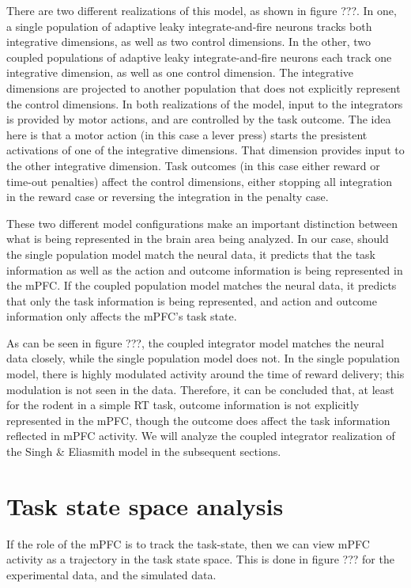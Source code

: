 \documentclass[12pt]{article}
\begin{document}
There are two different realizations
of this model, as shown in figure ???.
In one, a single population of adaptive
leaky integrate-and-fire neurons tracks both
integrative dimensions, as well as two control dimensions.
In the other, two coupled populations
of adaptive leaky integrate-and-fire neurons
each track one integrative dimension, as well
as one control dimension.
The integrative dimensions are projected
to another population that does not explicitly
represent the control dimensions.
In both realizations of the model,
input to the integrators is provided
by motor actions, and are controlled
by the task outcome.
The idea here is that a motor action
(in this case a lever press)
starts the presistent activations
of one of the integrative dimensions.
That dimension provides input to the other integrative dimension.
Task outcomes (in this case either reward
or time-out penalties) affect the control dimensions,
either stopping all integration
in the reward case or
reversing the integration in the penalty case.

These two different model configurations
make an important distinction between
what is being represented in the brain
area being analyzed.
In our case, should the single population model
match the neural data,
it predicts that the task information
as well as the action and outcome information
is being represented in the mPFC.
If the coupled population model matches
the neural data,
it predicts that only the task information
is being represented, and action and outcome
information only affects the mPFC's
task state.

As can be seen in figure ???,
the coupled integrator model matches
the neural data closely, while the single population model
does not.
In the single population model,
there is highly modulated activity
around the time of reward delivery;
this modulation is not seen in the data.
Therefore, it can be concluded that,
at least for the rodent in a simple RT task,
outcome information is not explicitly
represented in the mPFC,
though the outcome does affect the task
information reflected in mPFC activity.
We will analyze the coupled integrator
realization of the Singh \& Eliasmith
model in the subsequent sections.

\section{Task state space analysis}

If the role of the mPFC is to track the task-state,
then we can view mPFC activity as a trajectory
in the task state space.
This is done in figure ??? for the experimental data,
and the simulated data.
\end{document}
